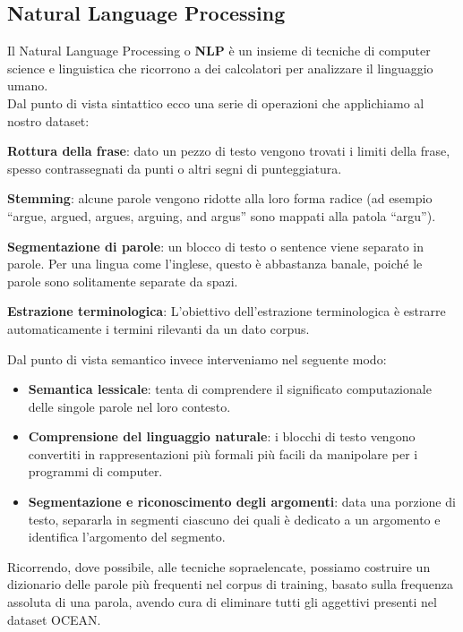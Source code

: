 \subsection{Natural Language Processing}
\label{subsec:nlp}
Il Natural Language Processing o \textbf{NLP} è un insieme di tecniche di computer science e linguistica che ricorrono a dei {\color{orange}calcolatori} per analizzare il linguaggio umano.\\
Dal punto di vista sintattico ecco una serie di operazioni che applichiamo al nostro dataset:
\begin{itemize}
	\item \textbf{Rottura della frase}: dato un pezzo di testo vengono trovati i limiti della frase, spesso contrassegnati da punti o altri segni di punteggiatura.
	\item \textbf{Stemming}: alcune parole vengono ridotte alla loro forma radice (ad esempio ``argue, argued, argues, arguing, and argus'' sono mappati alla patola ``argu'').
	\item \textbf{Segmentazione di parole}: un blocco di testo o sentence viene separato in parole. Per una lingua come l'inglese, questo è abbastanza banale, poiché le parole sono solitamente separate da spazi. 
	{\color{orange}	\item \textbf{Estrazione terminologica}: L'obiettivo dell'estrazione terminologica è estrarre automaticamente i termini rilevanti da un dato corpus.}
\end{itemize}
Dal punto di vista semantico invece interveniamo nel seguente modo:
\begin{itemize}
	\item \textbf{Semantica lessicale}: tenta di comprendere il significato computazionale delle singole parole nel loro contesto.
	\item \textbf{Comprensione del linguaggio naturale}: i blocchi di testo vengono convertiti in rappresentazioni più formali più facili da manipolare per i programmi di computer. 
	\item \textbf{Segmentazione e riconoscimento degli argomenti}: data una porzione di testo, separarla in segmenti ciascuno dei quali è dedicato a un argomento e identifica l'argomento del segmento.
\end{itemize}
Ricorrendo, dove possibile, alle tecniche sopraelencate, possiamo costruire un dizionario delle  parole più frequenti nel corpus di training, basato sulla frequenza assoluta di una parola, avendo cura di eliminare tutti gli aggettivi presenti nel dataset OCEAN.

